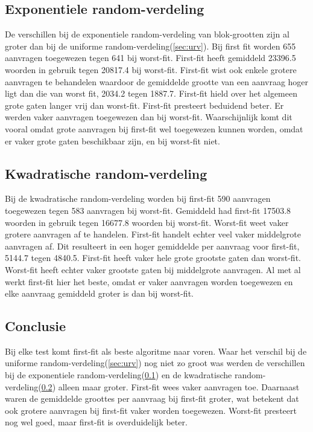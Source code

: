 \documentclass[a4paper]{article}
\begin{document}
		\subsection{Exponentiele random-verdeling}\label{sec:erv}
			De verschillen bij de exponentiele random-verdeling van blok-grootten zijn al groter dan bij de uniforme random-verdeling(\ref{sec:urv}).
			Bij first fit worden 655 aanvragen toegewezen tegen 641 bij worst-fit.
			First-fit heeft gemiddeld 23396.5 woorden in gebruik tegen 20817.4 bij worst-fit.
			First-fit wist ook enkele grotere aanvragen te behandelen waardoor de gemiddelde grootte van een aanvraag hoger ligt dan die van worst fit, 2034.2 tegen 1887.7.
			First-fit hield over het algemeen grote gaten langer vrij dan worst-fit.
			First-fit presteert beduidend beter.
			Er werden vaker aanvragen toegewezen dan bij worst-fit.
			Waarschijnlijk komt dit vooral omdat grote aanvragen bij first-fit wel toegewezen kunnen worden, omdat er vaker grote gaten beschikbaar zijn, en bij worst-fit niet.

		\subsection{Kwadratische random-verdeling}\label{sec:krv}
			Bij de kwadratische random-verdeling worden bij first-fit 590 aanvragen toegewezen tegen 583 aanvragen bij worst-fit.
			Gemiddeld had first-fit 17503.8 woorden in gebruik tegen 16677.8 woorden bij worst-fit.
			Worst-fit weet vaker grotere aanvragen af te handelen. 
			First-fit handelt echter veel vaker middelgrote aanvragen af.
			Dit resulteert in een hoger gemiddelde per aanvraag voor first-fit, 5144.7 tegen 4840.5.
			First-fit heeft vaker hele grote grootste gaten dan worst-fit.
			Worst-fit heeft echter vaker grootste gaten bij middelgrote aanvragen.
			Al met al werkt first-fit hier het beste, omdat er vaker aanvragen worden toegewezen en elke aanvraag gemiddeld groter is dan bij worst-fit.

		\newpage

		\subsection{Conclusie}
			Bij elke test komt first-fit als beste algoritme naar voren.
			Waar het verschil bij de uniforme random-verdeling(\ref{sec:urv}) nog niet zo groot was werden de verschillen bij de exponentiele random-verdeling(\ref{sec:erv}) en de kwadratische random-verdeling(\ref{sec:krv}) alleen maar groter.
			First-fit wees vaker aanvragen toe. Daarnaast waren de gemiddelde groottes per aanvraag bij first-fit groter, wat betekent dat ook grotere aanvragen bij first-fit vaker worden toegewezen.
			Worst-fit presteert nog wel goed, maar first-fit is overduidelijk beter.
\end{document}

